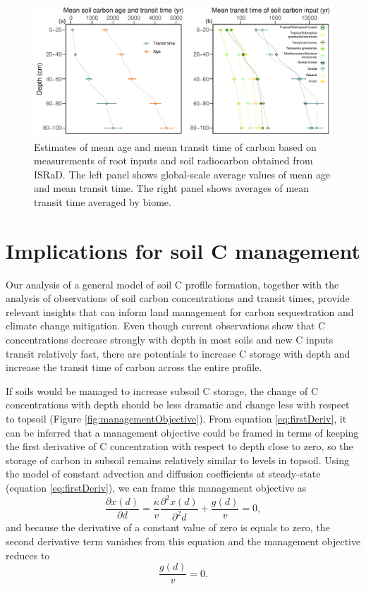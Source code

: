 \documentclass[11pt, oneside, a4paper]{article}   	%
\begin{document}
\begin{figure}[htbp]
   \centering
   \includegraphics[width=\textwidth]{Figures/biomeTransitTimes.pdf} %
   \caption{Estimates of mean age and mean transit time of carbon based on measurements of root inputs and soil radiocarbon obtained from ISRaD. The left panel shows global-scale average values of mean age and mean transit time. The right panel shows averages of mean transit time averaged by biome.}
   \label{fig:AgeTTprofiles}
\end{figure}

\section{Implications for soil C management}
Our analysis of a general model of soil C profile formation, together with the analysis of observations of soil carbon concentrations and transit times, provide relevant insights that can inform land management for carbon sequestration and climate change mitigation. 
Even though current observations show that C concentrations decrease strongly with depth in most soils and new C inputs transit relatively fast, there are potentials to increase C storage with depth and increase the transit time of carbon across the entire profile. 

If soils would be managed to increase subsoil C storage, the change of C concentrations with depth should be less dramatic and change less with respect to topsoil (Figure \ref{fig:managementObjective}). From equation \ref{eq:firstDeriv}, it can be inferred that a management objective could be framed in terms of keeping the first derivative of C concentration with respect to depth close to zero, so the storage of carbon in subsoil remains relatively similar to levels in topsoil. Using the model of constant advection and diffusion coefficients at steady-state (equation \ref{eq:firstDeriv}), we can frame this management objective as 
\begin{equation}
\frac{\partial x(d)}{\partial d} = \frac{\kappa}{v} \frac{\partial^2 x(d)}{\partial^2 d} + \frac{g(d)}{v} = 0,
\end{equation} 
and because the derivative of a constant value of zero is equals to zero, the second derivative term vanishes from this equation and the management objective reduces to
\begin{equation} \label{eq:objective}
 \frac{g(d)}{v} = 0.
\end{equation} 
\end{document}
